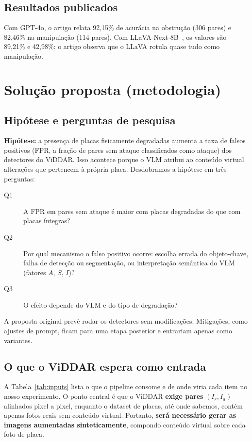 \documentclass[journal,onecolumn]{IEEEtran}
\newcommand{\Ir}{I_r}
\newcommand{\Ia}{I_a}
\begin{document}
\subsection{Resultados publicados}
Com GPT-4o, o artigo relata 92,15\% de acurácia na obstrução (306 pares) e 82,46\% na manipulação
(114 pares). Com LLaVA-Next-8B~\cite{llava}, os valores são 89,21\% e 42,98\%; o artigo observa que
o LLaVA rotula quase tudo como manipulação.

\section{Solução proposta (metodologia)}
\label{sec:metodo}

\subsection{Hipótese e perguntas de pesquisa}
\textbf{Hipótese:} a presença de placas fisicamente degradadas aumenta a taxa de falsos positivos
(FPR, a fração de pares sem ataque classificados como ataque) dos detectores do ViDDAR. Isso acontece
porque o VLM atribui ao conteúdo virtual alterações que pertencem à própria placa. Desdobramos a
hipótese em três perguntas:
\begin{description}
\item[Q1] A FPR em pares sem ataque é maior com placas degradadas do que com placas íntegras?
\item[Q2] Por qual mecanismo o falso positivo ocorre: escolha errada do objeto-chave, falha de
  detecção ou segmentação, ou interpretação semântica do VLM (fatores $A$, $S$, $I$)?
\item[Q3] O efeito depende do VLM e do tipo de degradação?
\end{description}
A proposta original prevê rodar os detectores sem modificações. Mitigações, como ajustes de prompt,
ficam para uma etapa posterior e entrariam apenas como variantes.

\subsection{O que o ViDDAR espera como entrada}
A Tabela~\ref{tab:inputs} lista o que o pipeline consome e de onde viria cada item no nosso
experimento. O ponto central é que o ViDDAR \textbf{exige pares} $(\Ir,\Ia)$ alinhados pixel a pixel,
enquanto o dataset de placas, até onde sabemos, contém apenas fotos reais sem conteúdo virtual.
Portanto, \textbf{será necessário gerar as imagens aumentadas sinteticamente}, compondo conteúdo
virtual sobre cada foto de placa.
\end{document}
